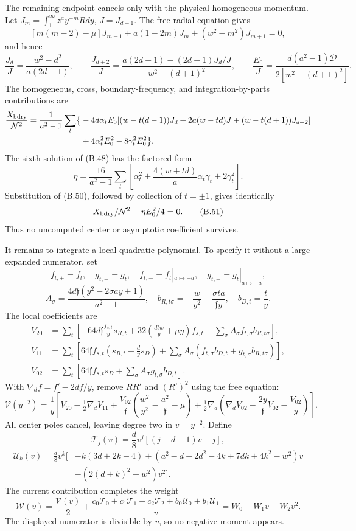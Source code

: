 The remaining endpoint cancels only with the physical homogeneous momentum. Let \(J_m=\int_1^\infty z^ay^{-m}Rdy\), \(J=J_{d+1}\). The free radial equation gives \[
[m(m-2)-\mu]J_{m-1}+a(1-2m)J_m+(w^2-m^2)J_{m+1}=0,
\] and hence \[
\frac{J_d}{J}=\frac{w^2-d^2}{a(2d-1)},\qquad
\frac{J_{d+2}}J=
\frac{a(2d+1)-(2d-1)J_d/J}{w^2-(d+1)^2},\qquad
\frac{E_0}{J}=\frac{d(a^2-1)\mathcal D}{2[w^2-(d+1)^2]}.
\tag{B.50}
\] The homogeneous, cross, boundary-frequency, and integration-by-parts contributions are \[
\begin{aligned}
\frac{X_{\rm bdry}}{\mathcal N^2}
=\frac1{a^2-1}\sum_t\bigl\{
&-4d\alpha_tE_0[(w-t(d-1))J_d
+2a(w-td)J+(w-t(d+1))J_{d+2}]\\
&+4\alpha_t^2E_0^2-8\gamma_t^2E_0^2\bigr\}.
\end{aligned}
\] The sixth solution of (B.48) has the factored form \[
\eta=\frac{16}{a^2-1}
\sum_t\left[\alpha_t^2+
\frac{4(w+td)}a\alpha_t\gamma_t+2\gamma_t^2\right].
\] Substitution of (B.50), followed by collection of \(t=\pm1\), gives identically \[
X_{\rm bdry}/\mathcal N^2+\eta E_0^2/4=0 .
\tag{B.51}
\] Thus no uncomputed center or asymptotic coefficient survives.

It remains to integrate a local quadratic polynomial. To specify it without a large expanded numerator, set \[
f_{t,+}=f_t,\quad g_{t,+}=g_t,\quad
f_{t,-}=f_t|_{a\mapsto-a},\quad
g_{t,-}=g_t|_{a\mapsto-a},
\] \[
A_\sigma=\frac{4d\mathfrak f(y^2-2\sigma ay+1)}{a^2-1},
\quad b_{R,t\sigma}=-\frac w{y^2}-\frac{\sigma ta}{\mathfrak f y},
\quad b_{D,t}=\frac t y.
\] The local coefficients are \[
\begin{aligned}
V_{20}&=\sum_t\left[
-64d\mathfrak f\frac{f_{s,t}}y s_{R,t}
+32\left(\frac{dtw}y+\mu y\right)f_{s,t}
+\sum_\sigma A_\sigma f_{t,\sigma}b_{R,t\sigma}\right],\\
V_{11}&=\sum_t\left[
64\mathfrak f f_{s,t}\left(s_{R,t}-\frac d y s_D\right)
+\sum_\sigma A_\sigma(f_{t,\sigma}b_{D,t}+g_{t,\sigma}b_{R,t\sigma})\right],\\
V_{02}&=\sum_t\left[
64\mathfrak f f_{s,t}s_D+\sum_\sigma A_\sigma g_{t,\sigma}b_{D,t}\right].
\end{aligned}
\] With \(\nabla_d f=f'-2df/y\), remove \(RR'\) and \((R')^2\) using the free equation: \[
\mathcal V(y^{-2})=\frac1y\left[
V_{20}-\tfrac12\nabla_dV_{11}
+\frac{V_{02}}{\mathfrak f}
\left(\frac{w^2}{y^2}-\frac{a^2}{\mathfrak f}-\mu\right)
+\tfrac12\nabla_d\left(\nabla_dV_{02}
-\frac{2y}{\mathfrak f}V_{02}-\frac{V_{02}}y\right)\right].
\tag{B.52}
\] All center poles cancel, leaving degree two in \(v=y^{-2}\). Define \[
\mathcal T_j(v)=\frac d8v^j[(j+d-1)v-j],
\] \[
\begin{aligned}
\mathcal U_k(v)=\frac d8v^k\big[
&
-k(3d+2k-4)
+(a^2-d+2d^2-4k+7dk+4k^2-w^2)v
\\&-(2(d+k)^2-w^2)v^2\big].
\end{aligned}
\] The current contribution completes the weight \[
\mathcal W(v)=\frac{\mathcal V(v)}2+
\frac{c_0\mathcal T_0+c_1\mathcal T_1+c_2\mathcal T_2
+b_0\mathcal U_0+b_1\mathcal U_1}{v}
=W_0+W_1v+W_2v^2 .
\tag{B.53}
\] The displayed numerator is divisible by \(v\), so no negative moment appears.

